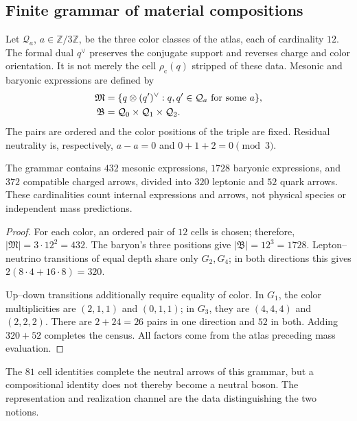 \subsection{Finite grammar of material compositions}
\label{vi:subsec:gramatica-compuestos}

Let \(\mathcal Q_a\), \(a\in\mathbb Z/3\mathbb Z\), be the three
color classes of the atlas, each of cardinality \(12\). The formal dual
\(q^\vee\) preserves the conjugate support and reverses charge
and color orientation. It is not merely the cell \(\rho_{\mathrm c}(q)\) stripped
of these data. Mesonic and baryonic expressions are defined by
\begin{align}
 \mathfrak M&=\{q\otimes(q')^\vee:
 q,q'\in\mathcal Q_a\text{ for some }a\},\notag\\
 \mathfrak B&=\mathcal Q_0\times\mathcal Q_1\times\mathcal Q_2.
 \label{vi:eq:gramatica-meson-barion}
\end{align}
The pairs are ordered and the color positions of the triple are
fixed. Residual neutrality is, respectively,
\(a-a=0\) and \(0+1+2=0\pmod3\).

\begin{proposition}
\label{vi:prop:censo-compuestos}
The grammar contains \(432\) mesonic expressions, \(1728\)
baryonic expressions, and \(372\) compatible charged arrows, divided
into \(320\) leptonic and \(52\) quark arrows. These cardinalities count
internal expressions and arrows, not physical species or independent
mass predictions.
\end{proposition}
\begin{proof}
For each color, an ordered pair of \(12\) cells is chosen; therefore,
\(|\mathfrak M|=3\cdot12^2=432\). The baryon's three positions give
\(|\mathfrak B|=12^3=1728\). Lepton--neutrino transitions of
equal depth share only \(G_2,G_4\); in both directions this
gives \(2(8\cdot4+16\cdot8)=320\).

Up--down transitions additionally require equality of color.
In \(G_1\), the color multiplicities are \((2,1,1)\) and
\((0,1,1)\); in \(G_3\), they are \((4,4,4)\) and \((2,2,2)\).
There are \(2+24=26\) pairs in one direction and \(52\) in both. Adding
\(320+52\) completes the census. All factors come from the atlas
preceding mass evaluation.
\end{proof}

The \(81\) cell identities complete the neutral arrows
of this grammar, but a compositional identity does not thereby become
a neutral boson. The representation and realization channel
are the data distinguishing the two notions.

